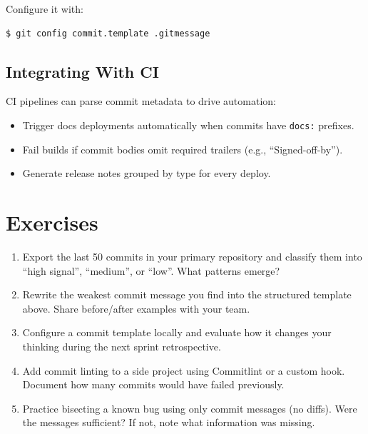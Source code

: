 Configure it with:
\begin{lstlisting}[style=shell]
$ git config commit.template .gitmessage
\end{lstlisting}

\subsection{Integrating With CI}
CI pipelines can parse commit metadata to drive automation:
\begin{itemize}
  \item Trigger docs deployments automatically when commits have \texttt{docs:} prefixes.
  \item Fail builds if commit bodies omit required trailers (e.g., ``Signed-off-by'').
  \item Generate release notes grouped by type for every deploy.
\end{itemize}

\section*{Exercises}
\begin{enumerate}
  \item Export the last 50 commits in your primary repository and classify them into ``high signal'', ``medium'', or ``low''. What patterns emerge?
  \item Rewrite the weakest commit message you find into the structured template above. Share before/after examples with your team.
  \item Configure a commit template locally and evaluate how it changes your thinking during the next sprint retrospective.
  \item Add commit linting to a side project using Commitlint or a custom hook. Document how many commits would have failed previously.
  \item Practice bisecting a known bug using only commit messages (no diffs). Were the messages sufficient? If not, note what information was missing.
\end{enumerate}
